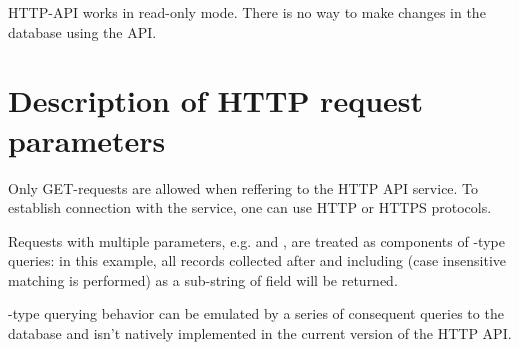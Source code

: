 \documentclass[letterpaper,10pt,english]{sphinxmanual}
\begin{document}
HTTP-API works in read-only mode.
There is no way to make changes in the database using the API.


\section{Description of HTTP request parameters}
\label{\detokenize{http_api:description-of-http-request-parameters}}
Only GET-requests are allowed when reffering to the HTTP API service.
To establish connection with the service, one can use HTTP or HTTPS protocols.

Requests with multiple parameters, e.g.  and ,
are treated as components of -type queries:
in this example, all records collected
after  and including 
(case insensitive matching is performed)
as a sub-string of  field will be returned.

-type querying behavior can be emulated by a series of
consequent queries to the database and isn’t natively implemented
in the current version of the HTTP API.
\end{document}
